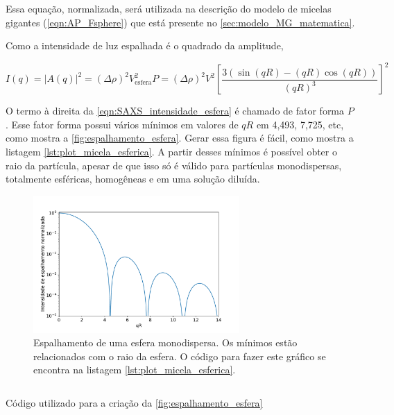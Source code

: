 		Essa equação, normalizada, será utilizada na descrição do modelo de micelas gigantes (\autoref{eqn:AP_Fsphere}) que está presente no \autoref{sec:modelo_MG_matematica}.
		
		Como a intensidade de luz espalhada é o quadrado da amplitude, \cite{Narayanan2008a}
		
		\begin{equation}
			I(q) = |A(q)|^2 = (\Delta \rho)^2 V_\mathrm{esfera}^2 P=(\Delta \rho)^2 V^2 \left[ \dfrac{3 \left( \sin (qR) - (qR) \cos (qR) \right)}{\left( qR \right) ^3} \right]^2
			\label{eqn:SAXS_intensidade_esfera}
		\end{equation}
		
		O termo à direita da \autoref{eqn:SAXS_intensidade_esfera} é chamado de fator forma \(P\).  Esse fator forma possui vários mínimos em valores de \(qR\) em 4,493, 7,725, etc, como mostra a \autoref{fig:espalhamento_esfera}. Gerar essa figura é fácil, como mostra a listagem \ref{lst:plot_micela_esferica}. A partir desses mínimos é possível obter o raio da partícula, apesar de que isso só é válido para partículas monodispersas, totalmente esféricas, homogêneas e em uma solução diluída. \cite{Pedersen_Aula1, Narayanan2008a}
		
		\begin{figure}[h]
			\centering
			\includegraphics[width=0.7\textwidth]{imagens/saxs/espalhamento_esfera_monodispersa}
			\caption{Espalhamento de uma esfera monodispersa. Os mínimos estão relacionados com o raio da esfera. O código para fazer este gráfico se encontra na listagem \ref{lst:plot_micela_esferica}.}
			\label{fig:espalhamento_esfera}
		\end{figure}
		
		\begin{listing}[h]
			\inputminted{python}{./python/plot_saxs_esfera.py}
			\caption{Código utilizado para a criação da \autoref{fig:espalhamento_esfera}}
			\label{lst:plot_micela_esferica}
		\end{listing}
		
